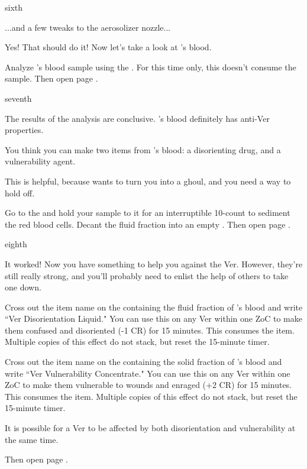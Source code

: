 \documentclass[greennotebook]{guildcamp4} %
\begin{document}
\begin{page}{sixth}

...and a few tweaks to the aerosolizer nozzle...

Yes! That should do it! Now let's take a look at \cPlead{}'s blood.

Analyze \cPlead{}'s blood sample using the \sBloodAnalyzer{}. For this time only, this doesn't consume the sample. Then open page .

\end{page}

\begin{page}{seventh}

The results of the analysis are conclusive. \cPlead{}'s blood definitely has anti-Ver properties. 

You think you can make two items from \cPlead{}'s blood: a disorienting drug, and a vulnerability agent. 

This is helpful, because \cVone{} wants to turn you into a ghoul, and you need a way to hold  off.

Go to the \sCentrifuge{} and hold your sample to it for an interruptible 10-count to sediment the red blood cells. Decant the fluid fraction into an empty \iTestTube{}. Then open page .

\end{page}

\begin{page}{eighth}

It worked! Now you have something to help you against the Ver. However, they're still really strong, and you'll probably need to enlist the help of others to take one down.

Cross out the item name on the \iTestTube{} containing the fluid fraction of \cPlead{}'s blood and write ``Ver Disorientation Liquid." You can use this on any Ver within one ZoC to make them confused and disoriented (-1 CR) for 15 minutes. This consumes the item. Multiple copies of this effect do not stack, but reset the 15-minute timer.

Cross out the item name on the \iTestTube{} containing the solid fraction of \cPlead{}'s blood and write ``Ver Vulnerability Concentrate." You can use this on any Ver within one ZoC to make them vulnerable to wounds and enraged (+2 CR) for 15 minutes. This consumes the item. Multiple copies of this effect do not stack, but reset the 15-minute timer.

It is possible for a Ver to be affected by both disorientation and vulnerability at the same time.

Then open page .

\end{page}
\end{document}

